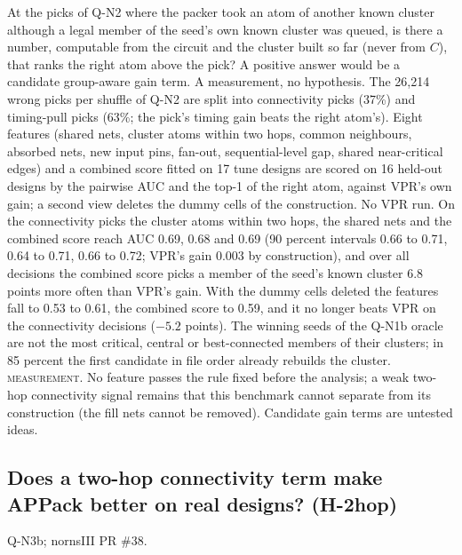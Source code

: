  At the picks of Q-N2 where the packer took an atom of another known cluster although a legal member of the seed's own known cluster was queued, is there a number, computable from the circuit and the cluster built so far (never from $C$), that ranks the right atom above the pick? A positive answer would be a candidate group-aware gain term. A measurement, no hypothesis.
 The 26{,}214 wrong picks per shuffle of Q-N2 are split into connectivity picks (37\%) and timing-pull picks (63\%; the pick's timing gain beats the right atom's). Eight features (shared nets, cluster atoms within two hops, common neighbours, absorbed nets, new input pins, fan-out, sequential-level gap, shared near-critical edges) and a combined score fitted on 17 tune designs are scored on 16 held-out designs by the pairwise AUC and the top-1 of the right atom, against VPR's own gain; a second view deletes the dummy cells of the construction. No VPR run.
 On the connectivity picks the cluster atoms within two hops, the shared nets and the combined score reach AUC 0.69, 0.68 and 0.69 (90 percent intervals 0.66 to 0.71, 0.64 to 0.71, 0.66 to 0.72; VPR's gain 0.003 by construction), and over all decisions the combined score picks a member of the seed's known cluster 6.8 points more often than VPR's gain. With the dummy cells deleted the features fall to 0.53 to 0.61, the combined score to 0.59, and it no longer beats VPR on the connectivity decisions ($-5.2$ points). The winning seeds of the Q-N1b oracle are not the most critical, central or best-connected members of their clusters; in 85 percent the first candidate in file order already rebuilds the cluster.
 \textsc{measurement}. No feature passes the rule fixed before the analysis; a weak two-hop connectivity signal remains that this benchmark cannot separate from its construction (the fill nets cannot be removed). Candidate gain terms are untested ideas.

\subsection{Does a two-hop connectivity term make APPack better on real designs? (H-2hop)}
\label{sec:e-2hop}

 Q-N3b; nornsIII PR \#38.

